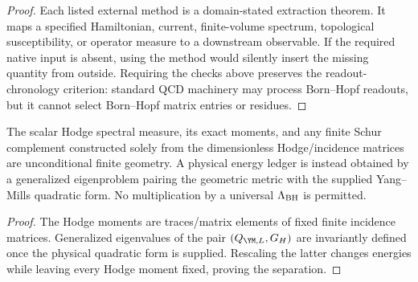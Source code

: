 \documentclass[12pt,a4paper]{article}
\begin{document}
\begin{proof}
Each listed external method is a domain-stated extraction theorem.  It maps a specified Hamiltonian, current, finite-volume spectrum, topological susceptibility, or operator measure to a downstream observable.  If the required native input is absent, using the method would silently insert the missing quantity from outside.  Requiring the checks above preserves the readout-chronology criterion: standard QCD machinery may process Born--Hopf readouts, but it cannot select Born--Hopf matrix entries or residues.
\end{proof}

\begin{theorem}
\label{p11:thm:exact-scalar-hodge-schur-ledger}

The scalar Hodge spectral measure, its exact moments, and any finite Schur complement constructed solely from the dimensionless Hodge/incidence matrices are unconditional finite geometry.  A physical energy ledger is instead obtained by a generalized eigenproblem pairing the geometric metric with the supplied Yang--Mills quadratic form.  No multiplication by a universal \(\Lambda_{\rm BH}\) is permitted.
\label{p11:eq:scalar-hodge-resolvent}
\label{p11:eq:scalar-hodge-ledger}
\end{theorem}
\begin{proof}

The Hodge moments are traces/matrix elements of fixed finite incidence matrices.  Generalized eigenvalues of the pair \((Q_{\YM,L},G_H)\) are invariantly defined once the physical quadratic form is supplied.  Rescaling the latter changes energies while leaving every Hodge moment fixed, proving the separation.
\end{proof}
\end{document}
